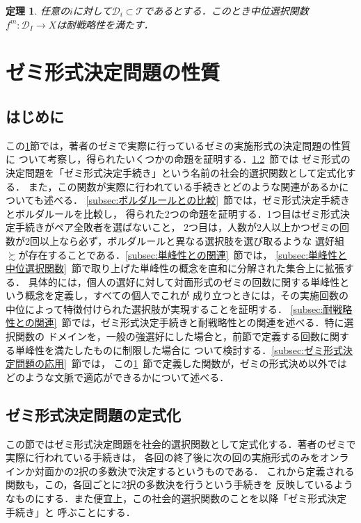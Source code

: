 \documentclass[dvipdfmx]{jsarticle}
\newtheorem{theorem}[definition]{定理}
\begin{document}
\begin{theorem}
  任意の$i$に対して$\mathcal{D}_i \subset \mathcal{T}$であるとする．このとき中位選択関数
  $f^m\colon \mathcal{D}_I \to X$は耐戦略性を満たす．
\end{theorem}

\section{ゼミ形式決定問題の性質}\label{sec:ゼミ形式決定問題の性質}
\subsection{はじめに}
この\ref{sec:ゼミ形式決定問題の性質}節では，著者のゼミで実際に行っているゼミの実施形式の決定問題の性質に
ついて考察し，得られたいくつかの命題を証明する．\ref{subsec:ゼミ形式決定問題の定式化}~節では
ゼミ形式の決定問題を「ゼミ形式決定手続き」という名前の社会的選択関数として定式化する．
また，この関数が実際に行われている手続きとどのような関連があるかについても述べる．
\ref{subsec:ボルダルールとの比較}~節では，ゼミ形式決定手続きとボルダルールを比較し，
得られた2つの命題を証明する．1つ目はゼミ形式決定手続きがペア全敗者を選ばないこと，
2つ目は，人数が2人以上かつゼミの回数が2回以上なら必ず，ボルダルールと異なる選択肢を選び取るような
選好組$\succsim$が存在することである．\ref{subsec:単峰性との関連}~節では，
\ref{subsec:単峰性と中位選択関数}~節で取り上げた単峰性の概念を直和に分解された集合上に拡張する．
具体的には，個人の選好に対して対面形式のゼミの回数に関する単峰性という概念を定義し，すべての個人でこれが
成り立つときには，その実施回数の中位によって特徴付けられた選択肢が実現することを証明する．
\ref{subsec:耐戦略性との関連}~節では，ゼミ形式決定手続きと耐戦略性との関連を述べる．特に選択関数の
ドメインを，一般の強選好にした場合と，前節で定義する回数に関する単峰性を満たしたものに制限した場合に
ついて検討する．\ref{subsec:ゼミ形式決定問題の応用}~節では，
この\ref{sec:ゼミ形式決定問題の性質}~節で定義した関数が，ゼミの形式決め以外では
どのような文脈で適応ができるかについて述べる．


\subsection{ゼミ形式決定問題の定式化}\label{subsec:ゼミ形式決定問題の定式化}
この節ではゼミ形式決定問題を社会的選択関数として定式化する．著者のゼミで実際に行われている手続きは，
各回の終了後に次の回の実施形式のみをオンラインか対面かの2択の多数決で決定するというものである．
これから定義される関数も，この，各回ごとに2択の多数決を行うという手続きを
反映しているようなものにする．また便宜上，この社会的選択関数のことを以降「ゼミ形式決定手続き」と
呼ぶことにする．
\end{document}
